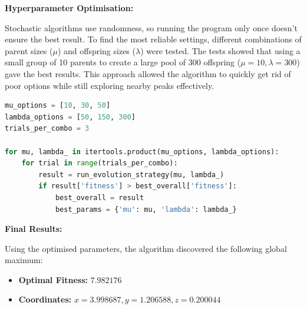 \documentclass[12pt, a4paper]{article}
\begin{document}
\vspace{0.5cm}

\hspace{-1.5em}\textbf{Hyperparameter Optimisation:}

\vspace{0.25cm}

Stochastic algorithms use randomness, so running the program only once doesn't ensure the best result. To find the most reliable settings, different combinations of parent sizes ($\mu$) and offspring sizes ($\lambda$) were tested. The tests showed that using a small group of 10 parents to create a large pool of 300 offspring ($\mu=10, \lambda=300$) gave the best results. This approach allowed the algorithm to quickly get rid of poor options while still exploring nearby peaks effectively.

\vspace{0.5cm}

\noindent\begin{minipage}{1\linewidth}
    \begin{lstlisting}[language=Python, caption=Automated grid search implementation for hyperparameter optimisation across varying parent $(\mu)$ and offspring $(\lambda)$ population sizes., label=lst:hyperparameter_1]
mu_options = [10, 30, 50]
lambda_options = [50, 150, 300]
trials_per_combo = 3

for mu, lambda_ in itertools.product(mu_options, lambda_options):
    for trial in range(trials_per_combo):
        result = run_evolution_strategy(mu, lambda_)
        if result['fitness'] > best_overall['fitness']:
            best_overall = result
            best_params = {'mu': mu, 'lambda': lambda_}
    \end{lstlisting}
\end{minipage}

\vspace{0.5cm}

\hspace{-1.5em}\textbf{Final Results:}

\vspace{0.25cm}

\hspace{-1.5em}Using the optimised parameters, the algorithm discovered the following global maximum:

\begin{itemize}
    \item \textbf{Optimal Fitness:} $7.982176$

    \item \textbf{Coordinates:} $x=3.998687, y=1.206588, z=0.200044$
\end{itemize}
\end{document}
